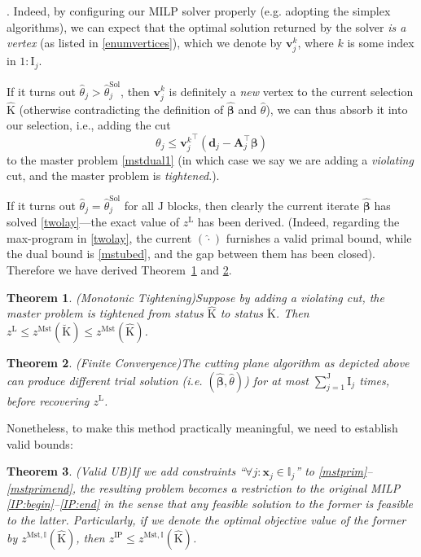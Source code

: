 \documentclass[journal]{IEEEtran}
\newtheorem{theorem}{Theorem}
\begin{document}
. Indeed, by configuring our MILP solver properly (e.g. adopting the simplex algorithms),
we can expect that the optimal solution returned by the
solver \textit{is a vertex} (as listed in \eqref{enumvertices}),
which we denote by $\mathbf{v}_j^k$, where $k$ is some index in
$1\!:\!\mathrm{I}_j$.
\par
If it turns out $\hat{\theta}_j > \hat{\theta}_j^\textrm{Sol}$, then $\mathbf{v}_j^k$ is definitely a \textit{new} vertex to the current selection $\hat{\mathrm{K}}$ (otherwise contradicting the definition of $\hat{\boldsymbol{\beta}}$ and $\hat{\theta}$), we can thus absorb it into our selection, i.e., adding the cut
\begin{equation}\label{eq:j_cut}
    \theta_j \le {\mathbf{v}_j^k}^\top(\mathbf{d}_j - \mathbf{A}_j^\top \boldsymbol{\beta})
\end{equation}
to the master problem \eqref{mstdual1} (in which case we say we are adding a \textit{violating} cut,
and the master problem is \textit{tightened}.).
\par
If it turns out $\hat{\theta}_j = \hat{\theta}_j^\textrm{Sol}$ for all $\mathrm{J}$ blocks, then clearly the current iterate $\hat{\boldsymbol{\beta}}$ has solved \eqref{twolay}---the exact value of $z^\mathrm{L}$ has been derived. (Indeed, regarding the max-program in \eqref{twolay}, the current $(\hat{\cdot})$ furnishes a valid primal bound, while the dual bound is \eqref{mstubed}, and the gap between them has been closed). Therefore we have derived Theorem~\ref{monotonicti} and \ref{finiteTermination}.
\begin{theorem}(Monotonic Tightening)\label{monotonicti}
    Suppose by adding a violating cut, the master problem is tightened from status $\hat{\mathrm{K}}$ to
    status $\breve{\mathrm{K}}$. Then $z^\mathrm{L} \le z^\mathrm{Mst}(\breve{\mathrm{K}}) \le z^\mathrm{Mst}(\hat{\mathrm{K}})$.
\end{theorem}
\begin{theorem}(Finite Convergence)\label{finiteTermination}
    The cutting plane algorithm as depicted above can produce different trial solution (i.e. $(\hat{\boldsymbol{\beta}}, \hat{\theta})$) for at most $\sum_{j=1}^\mathrm{J} \mathrm{I}_j$ times, before recovering $z^\mathrm{L}$.
\end{theorem}
\par
Nonetheless, to make this method practically meaningful, we need to establish valid bounds:
\begin{theorem}(Valid UB)\label{theorem:ub}
    If we add constraints ``$\forall j:\mathbf{x}_j \in \mathbb{I}_j$''
    to \eqref{mstprim}--\eqref{mstprimend}, \textit{the resulting problem}
    becomes a restriction to \textit{the original MILP} \eqref{IP:begin}--\eqref{IP:end} in the
    sense that any feasible solution to the former is feasible to the latter.
    Particularly, if we denote the optimal objective value of the former
    by $z^{\mathrm{Mst}, \mathbb{I}}(\hat{\mathrm{K}})$, then
    \(z^\mathrm{IP} \le z^{\mathrm{Mst}, \mathbb{I}}(\hat{\mathrm{K}})\).
\end{theorem}
\end{document}

